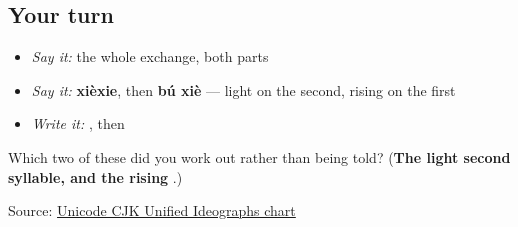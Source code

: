 \subsection*{Your turn}
\begin{itemize}
\raggedright
  \item \emph{Say it:} the whole exchange, both parts
  \item \emph{Say it:} \textbf{xièxie}, then \textbf{bú xiè} — light on the second, rising on the first
  \item \emph{Write it:} , then 
\end{itemize}

\begin{tcolorbox}[breakable,colback=teal!4,colframe=teal!35!black,title={Before you move on}]
Which two of these did you work out rather than being told? (\textbf{The light second syllable, and the rising }.)

Source: \href{https://www.unicode.org/charts/PDF/U4E00.pdf}{Unicode CJK Unified Ideographs chart}
\end{tcolorbox}
